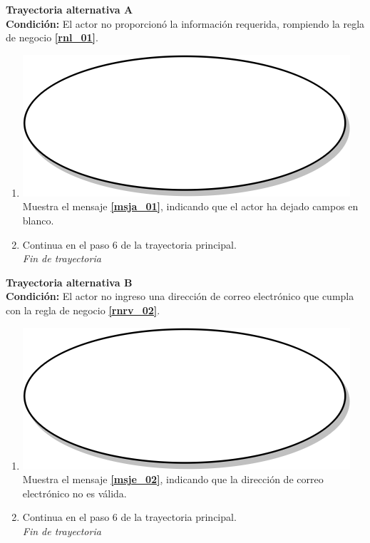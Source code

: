 \textbf{Trayectoria alternativa A} \label{cu1_1_ta_a} \\
\textbf{Condición:} El actor no proporcionó la información requerida, rompiendo la regla de negocio \textbf{\ref{rnl_01}}.\\
 \begin{enumerate}[label=A\arabic*]
    \item {\includegraphics[scale=.05]{Capitulo3/img/proceso.png} Muestra el mensaje \textbf{\ref{msja_01}}, indicando que el actor ha dejado campos en blanco.}
    \item {Continua en el paso 6  de la trayectoria principal.} \\
    \textit{Fin de trayectoria} \\
\end{enumerate}

\textbf{Trayectoria alternativa B} \label{cu1_1_ta_b}\\
\textbf{Condición:} El actor no ingreso una dirección de correo electrónico que cumpla con la regla de negocio \textbf{\ref{rnrv_02}}.\\
 \begin{enumerate}[label=B\arabic*]
    \item {\includegraphics[scale=.05]{Capitulo3/img/proceso.png} Muestra el mensaje \textbf{\ref{msje_02}}, indicando que la dirección de correo electrónico no es válida.}
    \item {Continua en el paso 6 de la trayectoria principal.} \\
    \textit{Fin de trayectoria} \\
\end{enumerate}

